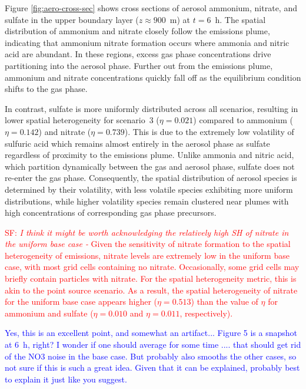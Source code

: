 \documentclass[journal abbreviation, manuscript]{copernicus}
\begin{document}
Figure \ref{fig:aero-cross-sec} shows cross sections of aerosol
ammonium, nitrate, and sulfate in the upper boundary layer
($z\approx900$~m) at $t=6$~h. The spatial distribution of ammonium and
nitrate closely follow the emissions plume, indicating that ammonium
nitrate formation occurs where ammonia and nitric acid are
abundant. In these regions, excess gas phase concentrations drive
partitioning into the aerosol phase. Further out from the emissions
plume, ammonium and nitrate concentrations quickly fall off as the
equilibrium condition shifts to the gas phase.

In contrast, sulfate is more uniformly distributed across all
scenarios, resulting in lower spatial heterogeneity for scenario~3
($\eta=0.021$) compared to ammonium ($\eta = 0.142$) and nitrate
($\eta=0.739$).  This is due to the extremely low volatility of
sulfuric acid which remains almost entirely in the aerosol phase as
sulfate regardless of proximity to the emissions plume. Unlike ammonia
and nitric acid, which partition dynamically between the gas and
aerosol phase, sulfate does not re-enter the gas phase. Consequently,
the spatial distribution of aerosol species is determined by their
volatility, with less volatile species exhibiting more uniform
distributions, while higher volatility species remain clustered near
plumes with high concentrations of corresponding gas phase precursors.

\textcolor{red}{SF: \emph{I think it might be worth acknowledging the
  relatively high SH of nitrate in the uniform base case -} Given the
  sensitivity of nitrate formation to the spatial heterogeneity of
  emissions, nitrate levels are extremely low in the uniform base
  case, with most grid cells containing no nitrate. Occasionally, some
  grid cells may briefly contain particles with nitrate. For the
  spatial heterogeneity metric, this is akin to the point source
  scenario. As a result, the spatial heterogeneity of nitrate for the
  uniform base case appears higher ($\eta=0.513$) than the value of
  $\eta$ for ammonium and sulfate ($\eta=0.010$ and $\eta=0.011$,
  respectively).}

\textcolor{blue}{Yes, this is an excellent point, and somewhat an
  artifact... Figure 5 is a snapshot at 6~h, right? I wonder if one
  should average for some time .... that should get rid of the NO3
  noise in the base case. But probably also smooths the other cases,
  so not sure if this is such a great idea. Given that it can be
  explained, probably best to explain it just like you suggest.}
\end{document}
